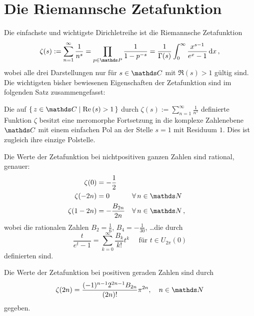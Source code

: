 \section{Die Riemannsche Zetafunktion}

Die einfachste und wichtigste Dirichletreihe ist die Riemannsche Zetafunktion
\[
	\zeta(s) 
	:= \sum_{n=1}^\infty \frac 1{n^s}
	= \prod_{p \in \PP} \frac 1{1 - p^{-s}}
	= \frac 1{\Gamma(s)} \int_0^\infty \frac {x^{s-1}}{e^x - 1} \opd x
	\,,
\]
wobei alle drei Darstellungen nur für $s \in \CC$ mit $\Re(s) > 1$ gültig sind. Die wichtigsten bisher bewiesenen Eigenschaften der Zetafunktion sind im folgenden Satz zusammengefasst:

\begin{satz}\label{Zeta-Fakten}
Die auf $\Set {z \in \CC \mid \Re(s) > 1}$ durch $\zeta(s) := \sum_{n=1}^\infty \frac 1{n^s}$ definierte Funktion $\zeta$ besitzt eine meromorphe Fortsetzung in die komplexe Zahlenebene $\CC$ mit einem einfachen Pol an der Stelle $s = 1$ mit Residuum $1$. Dies ist zugleich ihre einzige Polstelle. 

Die Werte der Zetafunktion bei nichtpositiven ganzen Zahlen sind rational, genauer:
\begin{align*}
	\zeta(0) &= - \frac 12 \\
	\zeta(-2n) &= 0 && \forall \, n \in \NN \\
	\zeta(1-2n) &= - \frac {B_{2n}}{2n} && \forall \, n \in \NN
	\,,
\end{align*}
wobei die rationalen Zahlen $B_2 = \frac 16$, $B_4 = - \frac 1{30}$, \ldots die durch
\[
	\frac t{e^t - 1} = \sum_{k=0}^\infty \frac {B_k}{k!} t^k \quad \text{ für } t \in U_{2\pi}(0)
\]
definierten  sind. 

Die Werte der Zetafunktion bei positiven geraden Zahlen sind durch
\[
	\zeta(2n) = \frac {(-1)^{n-1} 2^{2n-1} B_{2n}}{(2n)!} \pi^{2n}, \quad n \in \NN
\]
gegeben.
\end{satz}

